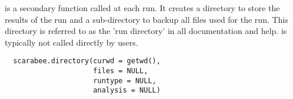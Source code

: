%
\begin{Description}\relax
{} is a secondary function called at each 
 run. It creates a directory to store the results of the run and
a sub-directory to backup all files used for the run. This directory is
referred to as the 'run directory' in all  documentation and
help.  is typically not called directly by users.
\end{Description}
%
\begin{Usage}
\begin{verbatim}
  scarabee.directory(curwd = getwd(),
                     files = NULL,
                     runtype = NULL,
                     analysis = NULL)
\end{verbatim}
\end{Usage}
%
